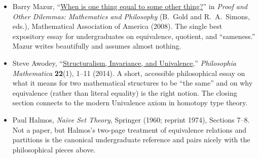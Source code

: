 \documentclass[11pt]{article}
\begin{document}
\begin{itemize}
  \item Barry Mazur, ``\href{https://people.math.osu.edu/cogdell.1/6112-Mazur-www.pdf}{When is one thing equal to some other thing?}'' in \emph{Proof and Other Dilemmas: Mathematics and Philosophy} (B.~Gold and R.~A.~Simons, eds.), Mathematical Association of America (2008). The single best expository essay for undergraduates on equivalence, quotient, and ``sameness.'' Mazur writes beautifully and assumes almost nothing.
  \item Steve Awodey, ``\href{https://www.andrew.cmu.edu/user/awodey/preprints/siu.pdf}{Structuralism, Invariance, and Univalence},'' \emph{Philosophia Mathematica} \textbf{22}(1), 1--11 (2014). A short, accessible philosophical essay on what it means for two mathematical structures to be ``the same'' and on why equivalence (rather than literal equality) is the right notion. The closing section connects to the modern Univalence axiom in homotopy type theory.
  \item Paul Halmos, \emph{Naive Set Theory}, Springer (1960; reprint 1974), Sections 7--8. Not a paper, but Halmos's two-page treatment of equivalence relations and partitions is the canonical undergraduate reference and pairs nicely with the philosophical pieces above.
\end{itemize}
\end{document}
